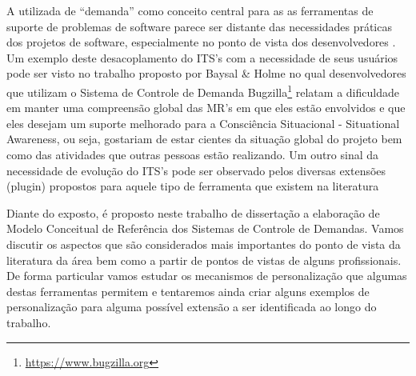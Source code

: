 \documentclass[msc,proposal,hidelot,hideabstract]{ppgccufmg} %
\begin{document}
A utilizada de  ``demanda'' como conceito central para as as ferramentas de
suporte de problemas de software parece ser distante das necessidades práticas dos projetos de software, especialmente
no ponto de vista dos desenvolvedores
\cite{Baysal:2013:SAP:2486788.2486957}. Um exemplo deste desacoplamento do
ITS's com a necessidade de seus usuários pode ser visto no trabalho proposto por Baysal \& Holme \cite{baysal2012qualitative} no qual desenvolvedores que utilizam o Sistema de
Controle de Demanda Bugzilla\footnote{\url{https://www.bugzilla.org}} relatam a
dificuldade em manter uma compreensão global das MR's em que eles estão
envolvidos e que eles desejam um suporte melhorado para a Consciência
Situacional - Situational Awareness, ou seja, gostariam de estar cientes da
situação global do projeto bem como das atividades que outras pessoas estão realizando. Um outro sinal da necessidade de evolução do
ITS's pode ser observado pelos diversas extensões (plugin) propostos para
aquele tipo de ferramenta que existem na literatura \cite{101186,Thung:2014:BIT:2635868.2661678,Kononenko:2014:DED:2591062.2591075}

Diante do exposto, é proposto neste  trabalho de dissertação a elaboração de
Modelo Conceitual de Referência dos Sistemas de Controle de Demandas. Vamos discutir os aspectos que são
considerados mais importantes do ponto de vista da literatura
da área bem como a partir de pontos de vistas de alguns profissionais. De forma particular vamos estudar os mecanismos de
personalização que algumas destas ferramentas permitem e tentaremos ainda criar alguns exemplos de personalização para alguma possível
extensão a ser identificada ao longo do trabalho.
\end{document}

